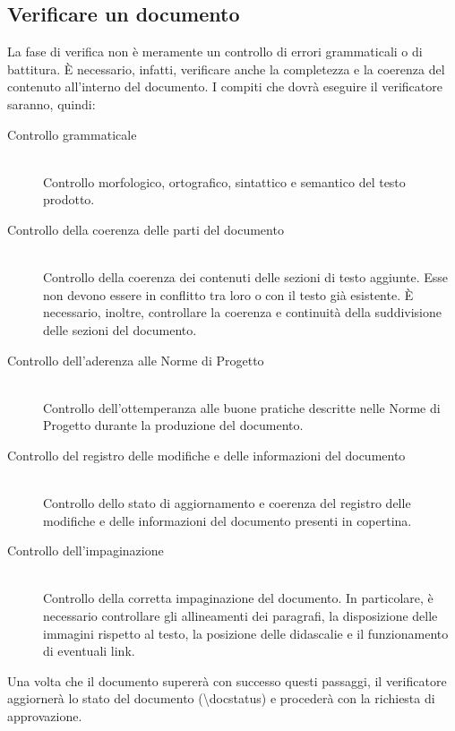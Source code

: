 \subsection{Verificare un documento}
La fase di verifica non è meramente un controllo di errori grammaticali o di battitura. È necessario, infatti, verificare anche la completezza e la coerenza del contenuto all'interno del documento.
I compiti che dovrà eseguire il verificatore saranno, quindi:
\begin{description}
    \item [Controllo grammaticale] \hfill \\ Controllo morfologico, ortografico, sintattico e semantico del testo prodotto.
    \item [Controllo della coerenza delle parti del documento] \hfill \\ Controllo della coerenza dei contenuti delle sezioni di testo aggiunte. Esse non devono essere in conflitto tra loro o con il testo già esistente. È necessario, inoltre, controllare la coerenza e continuità della suddivisione delle sezioni del documento.
    \item [Controllo dell'aderenza alle Norme di Progetto] \hfill \\ Controllo dell'ottemperanza alle buone pratiche descritte nelle Norme di Progetto durante la produzione del documento.
    \item [Controllo del registro delle modifiche e delle informazioni del documento] \hfill \\ Controllo dello stato di aggiornamento e coerenza del registro delle modifiche e delle informazioni del documento presenti in copertina.
    \item [Controllo dell'impaginazione] \hfill \\ Controllo della corretta impaginazione del documento. In particolare, è necessario controllare gli allineamenti dei paragrafi, la disposizione delle immagini rispetto al testo, la posizione delle didascalie e il funzionamento di eventuali link.
\end{description}
Una volta che il documento supererà con successo questi passaggi, il verificatore aggiornerà lo stato del documento (\textbackslash docstatus) e procederà con la richiesta di approvazione.

